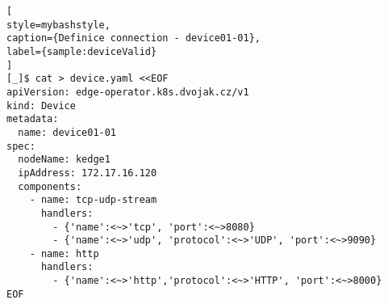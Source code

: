 \begin{lstfloat}
\begin{lstlisting}[
style=mybashstyle,
caption={Definice connection - device01-01},
label={sample:deviceValid}
]
[_]$ cat > device.yaml <<EOF
apiVersion: edge-operator.k8s.dvojak.cz/v1
kind: Device
metadata:
  name: device01-01
spec:
  nodeName: kedge1
  ipAddress: 172.17.16.120
  components:
    - name: tcp-udp-stream
      handlers:
        - {'name':<~>'tcp', 'port':<~>8080}
        - {'name':<~>'udp', 'protocol':<~>'UDP', 'port':<~>9090}
    - name: http
      handlers:
        - {'name':<~>'http','protocol':<~>'HTTP', 'port':<~>8000}
EOF
\end{lstlisting}
\end{lstfloat}
